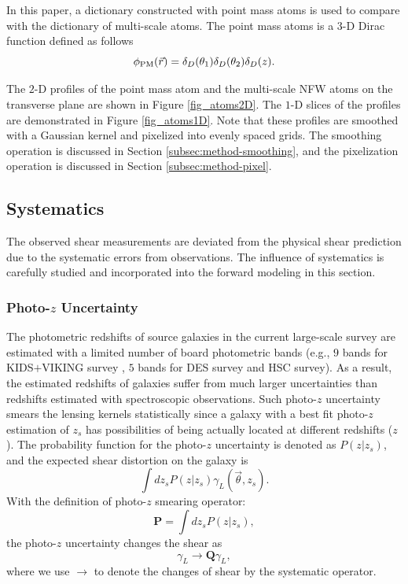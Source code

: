 \documentclass[twocolumn]{aastex62}
\begin{document}
In this paper, a dictionary constructed with point mass atoms is used to
compare with the dictionary of multi-scale atoms.  The point mass atoms is a
$3$-D Dirac function defined as follows
\begin{equation}
\phi_{\rm{PM}}(\vec{r})= \delta_D(\theta_1) \delta_D(\theta_2) \delta_D(z).
\end{equation}

The $2$-D profiles of the point mass atom and the multi-scale NFW atoms on the
transverse plane are shown in Figure \ref{fig_atoms2D}. The $1$-D slices of the
profiles are demonstrated in Figure \ref{fig_atoms1D}. Note that these profiles
are smoothed with a Gaussian kernel and pixelized into evenly spaced grids. The
smoothing operation is discussed in Section \ref{subsec:method-smoothing}, and
the pixelization operation is discussed in Section \ref{subsec:method-pixel}.

\subsection{Systematics}
\label{subsec:method-Systematics}

The observed shear measurements are deviated from the physical shear prediction
due to the systematic errors from observations. The influence of systematics is
carefully studied and incorporated into the forward modeling in this section.

\subsubsection{Photo-$z$ Uncertainty}
\label{subsec:method-photoz}

The photometric redshifts of source galaxies in the current large-scale survey
are estimated with a limited number of board photometric bands (e.g., $9$ bands
for KIDS$+$VIKING survey \citep{KIDS_VIKING-Hildebrant2020}, $5$ bands for DES
survey and HSC survey). As a result, the estimated redshifts of galaxies suffer
from much larger uncertainties than redshifts estimated with spectroscopic
observations. Such photo-$z$ uncertainty smears the lensing kernels
statistically since a galaxy with a best fit photo-$z$ estimation of $z_s$ has
possibilities of being actually located at different redshifts ($z$).  The
probability function for the photo-$z$ uncertainty is denoted as $P(z|z_s)$,
and the expected shear distortion on the galaxy is
\begin{equation}\label{eq-delta2gamma-poz}
\int dz_s P(z|z_s) \gamma_L(\vec{\theta},z_s).
\end{equation}
With the definition of photo-$z$ smearing operator:
\begin{equation}
\mathbf{P} = \int dz_s P(z|z_s),
\end{equation}
the photo-$z$ uncertainty changes the shear as
\begin{equation}
\gamma_L \rightarrow \mathbf{Q} \gamma_L,
\end{equation}
where we use $\rightarrow$ to denote the changes of shear by the systematic
operator.
\end{document}
